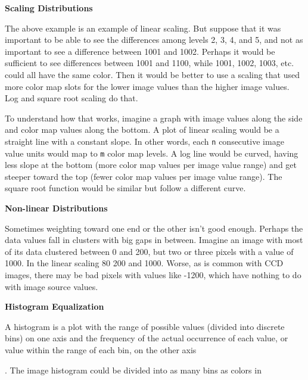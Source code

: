 {\bf Scaling Distributions}
\par
\vspace{0.1in}
The above example is an example of linear scaling.  But suppose that it
was important to be able to see the differences among levels 2, 3, 4,
and 5, and not as important to see a difference between 1001 and 1002.
Perhaps it would be sufficient to see differences between 1001 and 1100,
while 1001, 1002, 1003, etc. could all have the same color.  Then it would
be better to use a scaling that used more color map slots for the lower
image values than the higher image values.  Log and square root scaling
do that.
\par
\vspace{0.1in}
To understand how that works, imagine a graph with image values along
the side and color map values along the bottom.  A plot of linear
scaling would be a straight line with a constant slope.  In other
words, each {\tt n} consecutive image value units would map to {\tt m}
color map levels.  A log line would be curved, having less slope at
the bottom (more color map values per image value range) and get
steeper toward the top (fewer color map values per image value range).
The square root function would be similar but follow a different
curve.
\par
\vspace{0.1in}
{\bf Non-linear Distributions}
\par
\vspace{0.1in}
Sometimes weighting toward one end or the other isn't good enough.
Perhaps the data values fall in clusters with big gaps in between.
Imagine an image with most of its data clustered between 0 and 200,
but two or three pixels with a value of 1000.  In the linear scaling
80%
200 and 1000.  Worse, as is common with CCD images, there may be bad
pixels with values like -1200, which have nothing to do with image
source values.
\par
\vspace{0.1in}
{\bf Histogram Equalization}
\par
\vspace{0.1in}
A histogram is a plot with the range of possible values (divided into
discrete bins) on one axis and the frequency of the actual occurrence
of each value, or value within the range of each bin, on the other
axis
\par.
\vspace{0.1in}
The image histogram could be divided into as many bins as colors in

